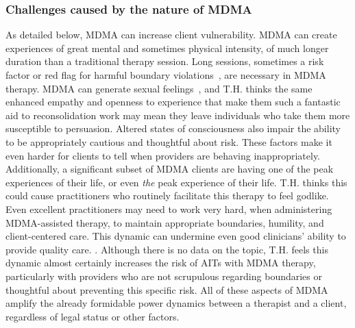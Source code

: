 \documentclass[11pt,oneside]{book}
\let\cite\parencite
\begin{document}
\subsubsection*{Challenges caused by the nature of MDMA}
As detailed below, MDMA can increase client vulnerability. MDMA can create experiences of great mental and sometimes physical intensity, of much longer duration than a traditional therapy session. Long sessions, sometimes a risk factor or red flag for harmful boundary violations~\cite{strom1999boundryViolations}, are necessary in MDMA therapy. MDMA can generate sexual feelings~\cite{mcelrath2005sex}, and T.H. thinks the same enhanced empathy and openness to experience that make them such a fantastic aid to reconsolidation work may mean they leave individuals who take them more susceptible to persuasion. Altered states of consciousness also impair the ability to be appropriately cautious and thoughtful about risk. These factors make it even harder for clients to tell when providers are behaving inappropriately. Additionally, a significant subset of MDMA clients are having one of the peak experiences of their life, or even \textit{the} peak experience of their life. T.H. thinks this could cause practitioners who routinely facilitate this therapy to feel godlike. Even excellent practitioners may need to work very hard, when administering MDMA-assisted therapy, to maintain appropriate boundaries, humility, and client-centered care. This dynamic can undermine even good clinicians' ability to provide quality care. . Although there is no data on the topic, T.H. feels this dynamic almost certainly increases the risk of AITs with MDMA therapy, particularly with providers who are not scrupulous regarding boundaries or thoughtful about preventing this specific risk. All of these aspects of MDMA amplify the already formidable power dynamics between a therapist and a client, regardless of legal status or other factors.
\end{document}
